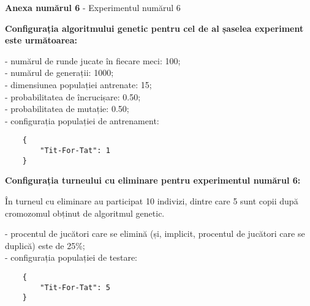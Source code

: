 \clearpage

\begin{center}
	\textbf{Anexa numărul 6} - Experimentul numărul 6
\end{center}

\textbf{Configurația algoritmului genetic pentru cel de al șaselea experiment este următoarea:}

- numărul de runde jucate în fiecare meci: 100;\\
- numărul de generații: 1000;\\
- dimensiunea populației antrenate: 15;\\
- probabilitatea de încrucișare: 0.50;\\
- probabilitatea de mutație: 0.50;\\
- configurația populației de antrenament:\\
\begin{center}
	\begin{lstlisting}
	{
		"Tit-For-Tat": 1
	}
	\end{lstlisting}
\end{center}

\textbf{Configurația turneului cu eliminare pentru experimentul numărul 6: }

În turneul cu eliminare au participat 10 indivizi, dintre care 5 sunt copii după cromozomul obținut de algoritmul genetic. 

- procentul de jucători care se elimină (și, implicit, procentul de jucători care se duplică) este de 25\%;\\
- configurația populației de testare:\\
\begin{center}
	\begin{lstlisting}
	{
		"Tit-For-Tat": 5
	}
	\end{lstlisting}
\end{center}